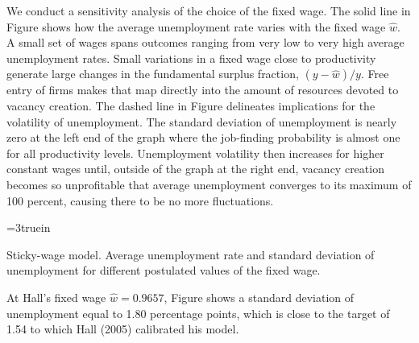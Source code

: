 We conduct a sensitivity analysis of the choice of the fixed wage.
The solid line in Figure  shows how
the average unemployment rate varies with the fixed wage $\hat w$.
A small set  of wages spans outcomes ranging from
 very low to  very high average unemployment rates.
Small variations in a fixed wage close to
productivity generate large changes in the fundamental surplus
fraction, $(y-\hat w)/y$.  Free entry of firms makes that map
directly into the amount of resources devoted to vacancy creation.
The dashed line in Figure 
delineates  implications
for the volatility of unemployment. The standard deviation of
unemployment is nearly zero at the left end of the graph where the
job-finding probability is almost one for all productivity levels.
Unemployment volatility then increases for higher constant wages
until, outside of the graph at the right end, vacancy creation
becomes so unprofitable that average unemployment converges to its
maximum of 100 percent, causing there to be no more fluctuations.



\centerline{\epsfxsize=3truein}
\caption{Sticky-wage model. Average unemployment rate and standard
deviation of unemployment for
different postulated values of the fixed wage.}
\endfigure


At Hall's fixed wage $\hat w = 0.9657$, Figure 
shows a standard deviation of unemployment equal to
1.80 percentage points, which is close to the target of 1.54 to which
Hall (2005) calibrated his model. 


